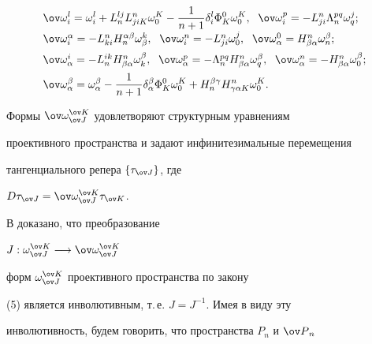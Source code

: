 \begin{equation}
\begin{array}{l}
%


\dd \ov \omega^l_i=\omega^l_i+


L^{lj}_n L^n_{jiK}\omega^K_0-


\frac 1{n+1} \delta^l_i \Phi^0_K \omega^K_0,\ \;


\ov \omega^p_i=-L^n_{ji} \Lambda^{pq}_n \omega^j_q; \\[2mm]


%


\ov \omega^\alpha_i=-L^n_{ki} H^{\alpha \beta}_n \omega^k_\beta,\ \;


\ov \omega^n_i=-L^n_{ji} \omega^j_0,\ \;


\ov \omega^0_\alpha=H^n_{\beta \alpha} \omega^\beta_n; \\[2mm]


%


\ov \omega^i_\alpha=-L^{ik}_n H^n_{\beta \alpha} \omega^\beta_k,\ \;


\ov \omega^{p}_\alpha=-\Lambda^{pq}_n H^n_{\beta \alpha} \omega^\beta_q,\ \;


\ov \omega^n_\alpha=-H^n_{\beta \alpha} \omega^\beta_0; \\[2mm]




\dd \ov \omega^\beta_\alpha=\omega^\beta_\alpha-


\frac 1{n+1} \delta^\beta_\alpha \Phi^0_K \omega^K_0+


H^{\beta \gamma}_n H^n_{\gamma \alpha K}\omega^K_0.


\end{array}


\end{equation}


Формы $\ov \omega^{\ov K}_{\ov J}$ удовлетворяют структурным уравнениям


проективного пространства и задают инфинитезимальные перемещения


тангенциального репера $\{\tau_{\ov J}\}$, где


$D\tau_{\ov J}=\ov \omega^{\ov K}_{\ov J}\tau_{\ov K}$.


В \cite{rab5} доказано, что преобразование


$J : \omega^{\ov K}_{\ov J}\longrightarrow\ov \omega^{\ov K}_{\ov J}$


форм $\omega^{\ov K}_{\ov J}$ проективного пространства по закону


(5) является инволютивным, т.\,е. $J=J^{-1}$. Имея в виду эту


инволютивность, будем говорить, что пространства $P_n$ и ${\ov P}_n$


